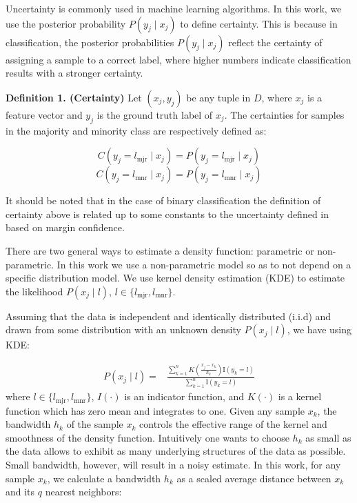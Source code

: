 \documentclass{iitthesis}
\begin{document}
 
Uncertainty is commonly used in machine learning algorithms. In this work, we use the posterior probability $P(y_j \mid x_j)$ to define certainty. This is because in classification, the posterior probabilities $P(y_j \mid x_j)$ reflect the certainty of assigning a sample to a correct label, where higher numbers indicate classification results with a stronger certainty.

\noindent \textbf{Definition 1. (Certainty)} Let $(x_j, y_j)$ be any tuple in $D$, where $x_j$ is a feature vector and $y_j$ is the ground truth label of $x_j$. The certainties for samples in the majority and minority class are respectively defined as:

\begin{equation}
C(y_j=l_{\mbox{mjr}} \mid x_j) = P(y_j=l_{\mbox{mjr}}\mid x_j)
\end{equation}
\begin{equation}
C(y_j=l_{\mbox{mnr}} \mid x_j) = P(y_j=l_{\mbox{mnr}}\mid x_j)
\end{equation} 

It should be noted that in the case of binary classification the definition of certainty above is related up to some constants to the uncertainty defined in \cite{2013Sharma} based on margin confidence.

 There are two general ways to estimate a density function: parametric or non-parametric. In this work we use a non-parametric model so as to not depend on a specific distribution model. We use kernel density estimation (KDE)\cite{elgammal2002background}\cite{zhang2006bayesian} to estimate the likelihood $P(x_j\mid l)$, $l\in \{l_{\mbox{mjr}}, l_{\mbox{mnr}}\}$.

Assuming that the data is independent and identically distributed (i.i.d) and drawn from some distribution with an unknown density $P(x_j \mid l)$, we have using KDE:

\begin{equation}
\begin{split}
P(x_j \mid l) =& \frac{\sum_{k=1}^n K(\frac{x_j-x_k}{h_k}) \mathrm{I}(y_k=l)}{\sum_{k=1}^n \mathrm{I}(y_k=l)}
\end{split}
\end{equation}
where $l \in \{l_{\mbox{mjr}}, l_{\mbox{mnr}}\}$, $I(\cdot)$ is an indicator function, and $K(\cdot)$ is a kernel function which has zero mean and integrates to one. Given any sample $x_k$, the bandwidth $h_k$ of the sample $x_k$ controls the effective range of the kernel and smoothness of the density function. Intuitively one wants to choose $h_k$ as small as the data allows to exhibit as many underlying structures of the data as possible. Small bandwidth, however, will result in a noisy estimate. In this work, for any sample $x_k$, we calculate a bandwidth $h_k$ as a scaled average distance between $x_k$ and its $q$ nearest neighbors:
\end{document}
